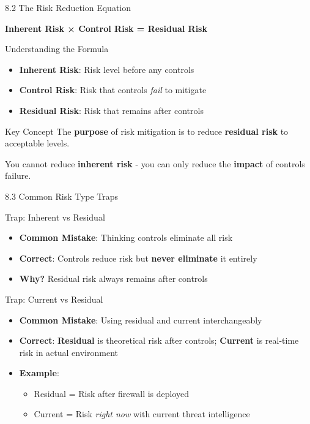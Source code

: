 \documentclass{beamer}
\begin{document}
	\begin{frame}{8.2 The Risk Reduction Equation}
		\begin{center}
			\Large{\textbf{Inherent Risk × Control Risk = Residual Risk}}
		\end{center}
		
		\begin{block}{Understanding the Formula}
			\begin{itemize}
				\item \textbf{Inherent Risk}: Risk level before any controls
				\item \textbf{Control Risk}: Risk that controls \textit{fail} to mitigate
				\item \textbf{Residual Risk}: Risk that remains after controls
			\end{itemize}
		\end{block}
		
		\begin{exampleblock}{Key Concept}
			The \textbf{purpose} of risk mitigation is to reduce \textbf{residual risk} to acceptable levels.
			
			You cannot reduce \textbf{inherent risk} - you can only reduce the \textbf{impact} of controls failure.
		\end{exampleblock}
	\end{frame}
	
	\begin{frame}{8.3 Common Risk Type Traps}
		\begin{block}{Trap: Inherent vs Residual}
			\begin{itemize}
				\item \textbf{Common Mistake}: Thinking controls eliminate all risk
				\item \textbf{Correct}: Controls reduce risk but \textbf{never eliminate} it entirely
				\item \textbf{Why?} Residual risk always remains after controls
			\end{itemize}
		\end{block}
		
		\begin{block}{Trap: Current vs Residual}
			\begin{itemize}
				\item \textbf{Common Mistake}: Using residual and current interchangeably
				\item \textbf{Correct}: \textbf{Residual} is theoretical risk after controls; \textbf{Current} is real-time risk in actual environment
				\item \textbf{Example}: 
				\begin{itemize}
					\item Residual = Risk after firewall is deployed
					\item Current = Risk \textit{right now} with current threat intelligence
				\end{itemize}
			\end{itemize}
		\end{block}
	\end{frame}
	
\end{document}
